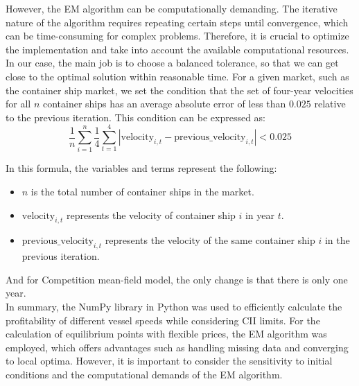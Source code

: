 \documentclass[a4paper,12pt]{article}
\begin{document}

However, the EM algorithm can be computationally demanding.
The iterative nature of the algorithm requires repeating certain steps until convergence, which can be time-consuming for complex problems.
Therefore, it is crucial to optimize the implementation and take into account the available computational resources.
In our case, the main job is to choose a balanced tolerance, so that we can get close to the optimal solution within reasonable time.
For a given market, such as the container ship market, we set the condition that the set of four-year velocities for all $n$ container ships has an average absolute error of less than $0.025$ relative to the previous iteration.
This condition can be expressed as:
\begin{equation}
	\frac{1}{n}\sum_{i=1}^{n} \frac{1}{4} \sum_{t=1}^{4} \left| \text{velocity}_{i,t} - \text{previous\_velocity}_{i,t} \right| < 0.025
\end{equation}

In this formula, the variables and terms represent the following:
\begin{itemize}
	\item $n$ is the total number of container ships in the market.
	\item $\text{velocity}_{i,t}$ represents the velocity of container ship $i$ in year $t$.
	\item $\text{previous\_velocity}_{i,t}$ represents the velocity of the same container ship $i$ in the previous iteration.
\end{itemize}

And for Competition mean-field model, the only change is that there is only one year.\\

In summary, the NumPy library in Python was used to efficiently calculate the profitability of different vessel speeds while considering CII limits.
For the calculation of equilibrium points with flexible prices, the EM algorithm was employed, which offers advantages such as handling missing data and converging to local optima.
However, it is important to consider the sensitivity to initial conditions and the computational demands of the EM algorithm.\\
\end{document}
